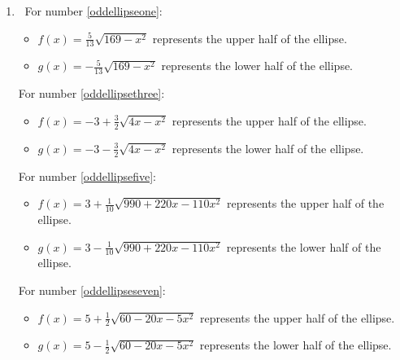 \documentclass{ximera}
\begin{document}
\begin{enumerate}
\setcounter{enumi}{\value{HW}}

\item $~$
For number \ref{oddellipseone}:

\begin{itemize}

\item  $f(x) = \frac{5}{13} \sqrt{169-x^2}$ represents the upper half of the ellipse.

\item  $g(x) =  -\frac{5}{13} \sqrt{169-x^2}$   represents the lower half of the ellipse.

\end{itemize}


For number \ref{oddellipsethree}:

\begin{itemize}

\item  $f(x) = -3 + \frac{3}{2} \sqrt{4x-x^2}$ represents the upper half of the ellipse.

\item  $g(x) =   -3 - \frac{3}{2} \sqrt{4x-x^2}$   represents the lower half of the ellipse.

\end{itemize}


For number \ref{oddellipsefive}:

\begin{itemize}

\item  $f(x) = 3 + \frac{1}{10} \sqrt{990+220x-110x^2}$ represents the upper half of the ellipse.

\item  $g(x) =   3 - \frac{1}{10} \sqrt{990+220x-110x^2}$   represents the lower half of the ellipse.

\end{itemize}


For number \ref{oddellipseseven}:

\begin{itemize}

\item  $f(x) = 5 + \frac{1}{2} \sqrt{60-20x-5x^2}$ represents the upper half of the ellipse.

\item  $g(x) =  5 - \frac{1}{2} \sqrt{60-20x-5x^2}$  represents the lower half of the ellipse.

\end{itemize}



\end{enumerate}
\end{document}
